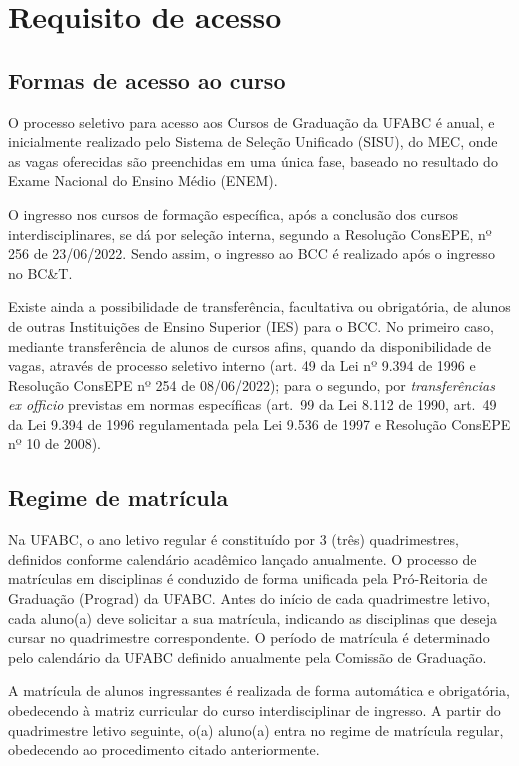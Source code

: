 \section{Requisito de acesso}
\label{sec:acesso}

\subsection{Formas de acesso ao curso}

O processo seletivo para acesso aos Cursos de Graduação da UFABC é anual, e
inicialmente realizado pelo Sistema de Seleção Unificado (SISU), do MEC, onde
as vagas oferecidas são preenchidas em uma única fase, baseado no resultado
do Exame Nacional do Ensino Médio (ENEM).

O ingresso nos cursos de formação específica, após a conclusão dos cursos
interdisciplinares, se dá por seleção interna, segundo a Resolução ConsEPE, nº
256 de 23/06/2022.
Sendo assim, o ingresso ao BCC é realizado após o ingresso no BC\&T.

Existe ainda a possibilidade de transferência, facultativa ou obrigatória, de
alunos de outras Instituições de Ensino Superior (IES) para o BCC.
No primeiro caso, mediante transferência de alunos de cursos afins, quando da
disponibilidade de vagas, através de processo seletivo interno (art. 49 da Lei
nº 9.394 de 1996 e Resolução ConsEPE nº 254 de 08/06/2022); para o
segundo, por \textit{transferências ex officio} previstas em normas específicas
(art.\ 99 da Lei 8.112 de 1990, art.\ 49 da Lei 9.394 de 1996 regulamentada
pela Lei 9.536 de 1997 e Resolução ConsEPE nº 10 de 2008).

\subsection{Regime de matrícula}

Na UFABC, o ano letivo regular é constituído por 3 (três) quadrimestres,
definidos conforme calendário acadêmico lançado anualmente.
O processo de matrículas em disciplinas é conduzido de forma unificada pela
Pró-Reitoria de Graduação (Prograd) da UFABC.
Antes do início de cada quadrimestre letivo, cada aluno(a) deve solicitar a sua
matrícula, indicando as disciplinas que deseja cursar no quadrimestre
correspondente.
O período de matrícula é determinado pelo calendário da UFABC definido
anualmente pela Comissão de Graduação.

A matrícula de alunos ingressantes é realizada de forma automática e
obrigatória, obedecendo à matriz curricular do curso interdisciplinar de
ingresso.
A partir do quadrimestre letivo seguinte, o(a) aluno(a) entra no regime de
matrícula regular, obedecendo ao procedimento citado anteriormente.

